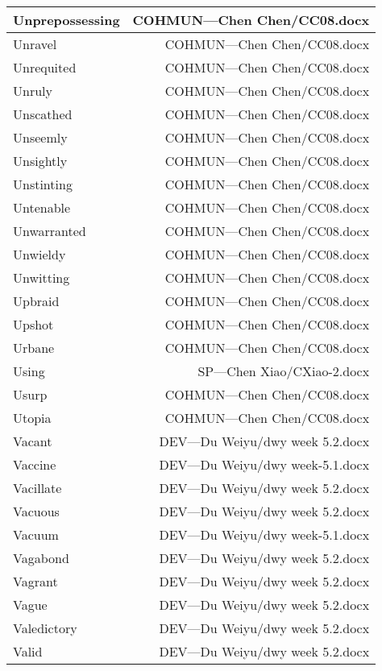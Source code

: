 \documentclass{article}
\begin{document}
\begin{center}
\begin{longtable}{|l|r|}
\hline
Unprepossessing  &  COHMUN---Chen Chen/CC08.docx\\  
\hline
Unravel  &  COHMUN---Chen Chen/CC08.docx\\  
\hline
Unrequited  &  COHMUN---Chen Chen/CC08.docx\\  
\hline
Unruly  &  COHMUN---Chen Chen/CC08.docx\\  
\hline
Unscathed  &  COHMUN---Chen Chen/CC08.docx\\  
\hline
Unseemly  &  COHMUN---Chen Chen/CC08.docx\\  
\hline
Unsightly  &  COHMUN---Chen Chen/CC08.docx\\  
\hline
Unstinting  &  COHMUN---Chen Chen/CC08.docx\\  
\hline
Untenable  &  COHMUN---Chen Chen/CC08.docx\\  
\hline
Unwarranted  &  COHMUN---Chen Chen/CC08.docx\\  
\hline
Unwieldy  &  COHMUN---Chen Chen/CC08.docx\\  
\hline
Unwitting  &  COHMUN---Chen Chen/CC08.docx\\  
\hline
Upbraid  &  COHMUN---Chen Chen/CC08.docx\\  
\hline
Upshot  &  COHMUN---Chen Chen/CC08.docx\\  
\hline
Urbane  &  COHMUN---Chen Chen/CC08.docx\\  
\hline
Using  &  SP---Chen Xiao/CXiao-2.docx\\  
\hline
Usurp  &  COHMUN---Chen Chen/CC08.docx\\  
\hline
Utopia  &  COHMUN---Chen Chen/CC08.docx\\  
\hline
Vacant  &  DEV---Du Weiyu/dwy week 5.2.docx\\  
\hline
Vaccine  &  DEV---Du Weiyu/dwy week-5.1.docx\\  
\hline
Vacillate  &  DEV---Du Weiyu/dwy week 5.2.docx\\  
\hline
Vacuous  &  DEV---Du Weiyu/dwy week 5.2.docx\\  
\hline
Vacuum  &  DEV---Du Weiyu/dwy week-5.1.docx\\  
\hline
Vagabond  &  DEV---Du Weiyu/dwy week 5.2.docx\\  
\hline
Vagrant  &  DEV---Du Weiyu/dwy week 5.2.docx\\  
\hline
Vague  &  DEV---Du Weiyu/dwy week 5.2.docx\\  
\hline
Valedictory  &  DEV---Du Weiyu/dwy week 5.2.docx\\  
\hline
Valid  &  DEV---Du Weiyu/dwy week 5.2.docx\\  

\end{longtable}
\end{center}
\end{document}
